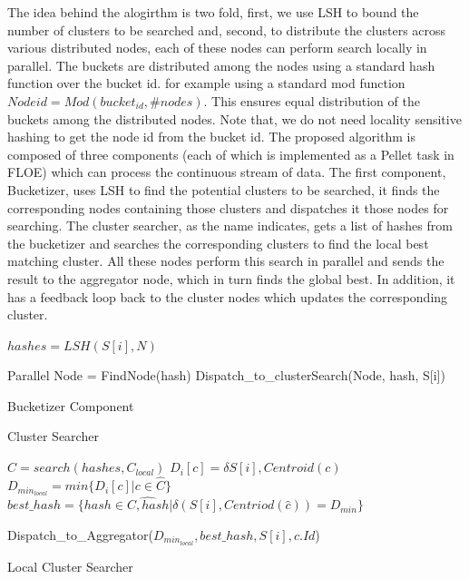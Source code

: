 \documentclass{article} %
\begin{document}
The idea behind the alogirthm is two fold, first, we use LSH to bound the number of clusters to be searched and, second, to distribute the clusters across various distributed nodes, each of these nodes can perform search locally in parallel. The buckets are distributed among the nodes using a standard hash function over the bucket id. for example using a standard mod function $Node id = Mod(bucket_{id}, \#nodes)$. This ensures equal distribution of the buckets among the distributed nodes. Note that, we do not need locality sensitive hashing to get the node id from the bucket id. The proposed algorithm is composed of three components (each of which is implemented as a Pellet task in FLOE) which can process the continuous stream of data. The first component, Bucketizer, uses LSH to find the potential clusters to be searched, it finds the corresponding nodes containing those clusters and dispatches it those nodes for searching. The cluster searcher, as the name indicates, gets a list of hashes from the bucketizer and searches the corresponding clusters to find the local best matching cluster. All these nodes perform this search in parallel and sends the result to the aggregator node, which in turn finds the global best. In addition, it has a feedback loop back to the cluster nodes which updates the corresponding cluster.

\begin{algorithm}
\SetAlgoLined 
{}
	{
		$hashes = LSH(S[i],N)$ \;

		Parallel 
		{
			Node = FindNode(hash)\;
			Dispatch\_to\_clusterSearch(Node, hash, S[i])	
		}
	}				
\label{algo:dlsh1}
\caption{Bucketizer Component}
\end{algorithm}

\begin{algorithm}
Cluster Searcher\\
\SetAlgoLined 
{}

	$\hat{C} = search(hashes,C_{local})$\;
	{
		$D_i[c] = \delta{S[i],Centroid(c)}$\;
	}
	$D_{min_{local}} = min\lbrace D_i[c] | c \in \hat{C} \rbrace$\;
	$best\_hash = \lbrace hash \in \hat{C,hash} | \delta(S[i],Centriod(\hat{c})) = D_{min} \rbrace$ \;
	
	Dispatch\_to\_Aggregator($D_{min_{local}}, best\_hash, S[i], c.Id$)\;	
	
\label{algo:dlsh2}
\caption{Local Cluster Searcher}
\end{algorithm}
\end{document}
